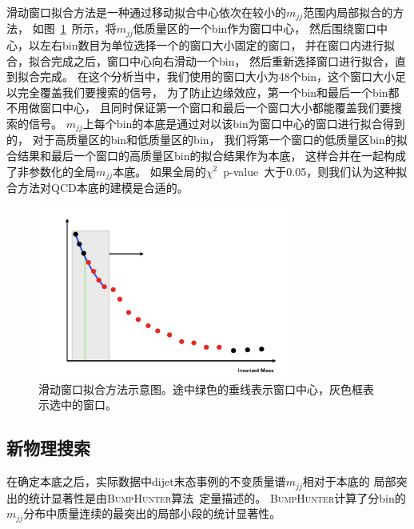 滑动窗口拟合方法是一种通过移动拟合中心依次在较小的$m_{jj}$范围内局部拟合的方法，
如图~\ref{fig:Mjj1}~所示，将$m_{jj}$低质量区的一个bin作为窗口中心，
然后围绕窗口中心，以左右bin数目为单位选择一个的窗口大小固定的窗口，
并在窗口内进行拟合，拟合完成之后，窗口中心向右滑动一个bin，
然后重新选择窗口进行拟合，直到拟合完成。
在这个分析当中，我们使用的窗口大小为48个bin，这个窗口大小足以完全覆盖我们要搜索的信号，
为了防止边缘效应，第一个bin和最后一个bin都不用做窗口中心，
且同时保证第一个窗口和最后一个窗口大小都能覆盖我们要搜索的信号。
$m_{jj}$上每个bin的本底是通过对以该bin为窗口中心的窗口进行拟合得到的，
对于高质量区的bin和低质量区的bin，
我们将第一个窗口的低质量区bin的拟合结果和最后一个窗口的高质量区bin的拟合结果作为本底，
这样合并在一起构成了非参数化的全局$m_{jj}$本底。
如果全局的$\chi^2$~p-value~\cite{CHI2}大于0.05，则我们认为这种拟合方法对QCD本底的建模是合适的。

\begin{figure}[thbp]
  \centering
  \includegraphics[width=0.75\textwidth]{figuresDijet/Mjj1.jpg}
  \caption{ 滑动窗口拟合方法示意图。途中绿色的垂线表示窗口中心，灰色框表示选中的窗口。  }
  \label{fig:Mjj1}
\end{figure}


\subsection{新物理搜索}
\label{sec:DijetMjj2}


在确定本底之后，实际数据中dijet末态事例的不变质量谱$m_{jj}$相对于本底的
局部突出的统计显著性是由\textsc{BumpHunter}算法~\cite{Aaltonen:2008vt,Choudalakis:2011bh}定量描述的。
\textsc{BumpHunter}计算了分bin的$m_{jj}$分布中质量连续的最突出的局部小段的统计显著性。

